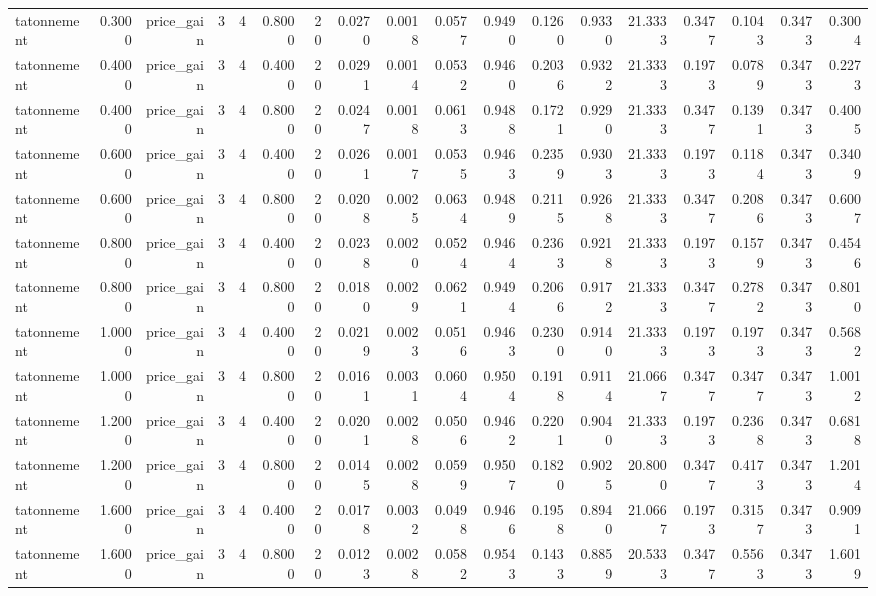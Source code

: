 \begin{table}[htbp]
\begin{tabular}{lrrrrrrrrrrrrrrrrr}
tatonnement & 0.3000 & price\_gain & 3 & 4 & 0.8000 & 20 & 0.0270 & 0.0018 & 0.0577 & 0.9490 & 0.1260 & 0.9330 & 21.3333 & 0.3477 & 0.1043 & 0.3473 & 0.3004 \\
tatonnement & 0.4000 & price\_gain & 3 & 4 & 0.4000 & 20 & 0.0291 & 0.0014 & 0.0532 & 0.9460 & 0.2036 & 0.9322 & 21.3333 & 0.1973 & 0.0789 & 0.3473 & 0.2273 \\
tatonnement & 0.4000 & price\_gain & 3 & 4 & 0.8000 & 20 & 0.0247 & 0.0018 & 0.0613 & 0.9488 & 0.1721 & 0.9290 & 21.3333 & 0.3477 & 0.1391 & 0.3473 & 0.4005 \\
tatonnement & 0.6000 & price\_gain & 3 & 4 & 0.4000 & 20 & 0.0261 & 0.0017 & 0.0535 & 0.9463 & 0.2359 & 0.9303 & 21.3333 & 0.1973 & 0.1184 & 0.3473 & 0.3409 \\
tatonnement & 0.6000 & price\_gain & 3 & 4 & 0.8000 & 20 & 0.0208 & 0.0025 & 0.0634 & 0.9489 & 0.2115 & 0.9268 & 21.3333 & 0.3477 & 0.2086 & 0.3473 & 0.6007 \\
tatonnement & 0.8000 & price\_gain & 3 & 4 & 0.4000 & 20 & 0.0238 & 0.0020 & 0.0524 & 0.9464 & 0.2363 & 0.9218 & 21.3333 & 0.1973 & 0.1579 & 0.3473 & 0.4546 \\
tatonnement & 0.8000 & price\_gain & 3 & 4 & 0.8000 & 20 & 0.0180 & 0.0029 & 0.0621 & 0.9494 & 0.2066 & 0.9172 & 21.3333 & 0.3477 & 0.2782 & 0.3473 & 0.8010 \\
tatonnement & 1.0000 & price\_gain & 3 & 4 & 0.4000 & 20 & 0.0219 & 0.0023 & 0.0516 & 0.9463 & 0.2300 & 0.9140 & 21.3333 & 0.1973 & 0.1973 & 0.3473 & 0.5682 \\
tatonnement & 1.0000 & price\_gain & 3 & 4 & 0.8000 & 20 & 0.0161 & 0.0031 & 0.0604 & 0.9504 & 0.1918 & 0.9114 & 21.0667 & 0.3477 & 0.3477 & 0.3473 & 1.0012 \\
tatonnement & 1.2000 & price\_gain & 3 & 4 & 0.4000 & 20 & 0.0201 & 0.0028 & 0.0506 & 0.9462 & 0.2201 & 0.9040 & 21.3333 & 0.1973 & 0.2368 & 0.3473 & 0.6818 \\
tatonnement & 1.2000 & price\_gain & 3 & 4 & 0.8000 & 20 & 0.0145 & 0.0028 & 0.0599 & 0.9507 & 0.1820 & 0.9025 & 20.8000 & 0.3477 & 0.4173 & 0.3473 & 1.2014 \\
tatonnement & 1.6000 & price\_gain & 3 & 4 & 0.4000 & 20 & 0.0178 & 0.0032 & 0.0498 & 0.9466 & 0.1958 & 0.8940 & 21.0667 & 0.1973 & 0.3157 & 0.3473 & 0.9091 \\
tatonnement & 1.6000 & price\_gain & 3 & 4 & 0.8000 & 20 & 0.0123 & 0.0028 & 0.0582 & 0.9543 & 0.1433 & 0.8859 & 20.5333 & 0.3477 & 0.5563 & 0.3473 & 1.6019 \\

\end{tabular}
\end{table}
